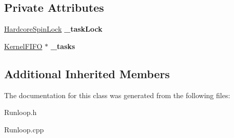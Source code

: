 \subsection*{Private Attributes}
\begin{DoxyCompactItemize}
\item 
\mbox{\label{class_task_queue_afd280ef186f6859539022e50dc032ecc}} 
\hyperlink{class_hardcore_spin_lock}{Hardcore\+Spin\+Lock} {\bfseries \+\_\+task\+Lock}
\item 
\mbox{\label{class_task_queue_abbc6cb37df2e3b7295e46d7326ca81ba}} 
\hyperlink{class_kernel_f_i_f_o}{Kernel\+F\+I\+FO} $\ast$ {\bfseries \+\_\+tasks}
\end{DoxyCompactItemize}
\subsection*{Additional Inherited Members}


The documentation for this class was generated from the following files\+:\begin{DoxyCompactItemize}
\item 
Runloop.\+h\item 
Runloop.\+cpp\end{DoxyCompactItemize}
